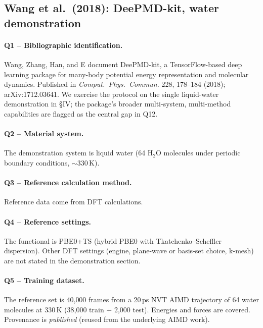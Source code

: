 \subsection{Wang et al.\ (2018): DeePMD-kit, water demonstration}
\label{sec:appendix-example-wang2018dpkit}

\paragraph{Q1 -- Bibliographic identification.}
Wang, Zhang, Han, and E document DeePMD-kit, a TensorFlow-based deep
learning package for many-body potential energy representation and
molecular dynamics. Published in \emph{Comput.\ Phys.\ Commun.} 228,
178--184 (2018); arXiv:1712.03641. We exercise the protocol on the
single liquid-water demonstration in \S IV; the package's broader
multi-system, multi-method capabilities are flagged as the central
gap in Q12.


\paragraph{Q2 -- Material system.}
The demonstration system is liquid water (64 H$_2$O molecules under
periodic boundary conditions, ${\sim}330$\,K).


\paragraph{Q3 -- Reference calculation method.}
Reference data come from DFT calculations.


\paragraph{Q4 -- Reference settings.}
The functional is PBE0+TS (hybrid PBE0 with Tkatchenko--Scheffler
dispersion). Other DFT settings (engine, plane-wave or basis-set
choice, k-mesh) are not stated in the demonstration section.


\paragraph{Q5 -- Training dataset.}
The reference set is 40{,}000 frames from a 20\,ps NVT AIMD trajectory
of 64 water molecules at 330\,K (38{,}000 train + 2{,}000 test).
Energies and forces are covered. Provenance is \emph{published}
(reused from the underlying AIMD work).


